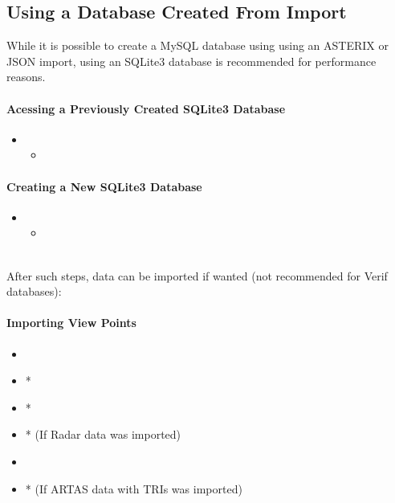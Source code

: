 \subsection{Using a Database Created From Import}

While it is possible to create a MySQL database using using an ASTERIX or JSON import, using an SQLite3 database is recommended for performance reasons.

\paragraph{Acessing a Previously Created SQLite3 Database} 

\begin{itemize}
\item {}
\begin{itemize}
 \item {}
 \end{itemize}
 \end{itemize}

\paragraph{Creating a New SQLite3 Database}

\begin{itemize}
\item {}
\begin{itemize}
 \item {}
\end{itemize}
\end{itemize}
\ \\

After such steps, data can be imported if wanted (not recommended for Verif databases):

\paragraph{Importing View Points} 

\begin{itemize}
 \item {}
 \item {}*
 \item {}*
 \item {}* (If Radar data was imported)
 \item {}
 \item {}* (If ARTAS data with TRIs was imported)
\end{itemize}

